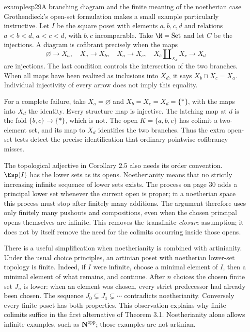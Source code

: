 \begin{dcomment}{examples}{p29}{A branching diagram and the finite meaning of the noetherian case}
Grothendieck's open-set formulation makes a small example particularly instructive. Let $I$ be the square poset with elements $a,b,c,d$ and relations $a<b<d$, $a<c<d$, with $b,c$ incomparable. Take $\M=\mathrm{Set}$ and let $C$ be the injections. A diagram is cofibrant precisely when the maps
\[
 \varnothing\longrightarrow X_a,\quad
 X_a\longrightarrow X_b,\quad X_a\longrightarrow X_c,\quad
 X_b\amalg_{X_a}X_c\longrightarrow X_d
\]
are injections. The last condition controls the intersection of the two branches. When all maps have been realized as inclusions into $X_d$, it says $X_b\cap X_c=X_a$. Individual injectivity of every arrow does not imply this equality.

For a complete failure, take $X_a=\varnothing$ and $X_b=X_c=X_d=\{*\}$, with the maps into $X_d$ the identity. Every structure map is injective. The latching map at $d$ is the fold $\{b,c\}\to\{*\}$, which is not. The open $K=\{a,b,c\}$ has colimit a two-element set, and its map to $X_d$ identifies the two branches. Thus the extra open-set tests detect the precise identification that ordinary pointwise cofibrancy misses.

The topological adjective in Corollary 2.5 also needs its order convention. $\Esp(I)$ has the lower sets as its opens. Noetherianity means that no strictly increasing infinite sequence of lower sets exists. The process on page 30 adds a principal lower set whenever the current open is proper; in a noetherian space this process must stop after finitely many additions. The argument therefore uses only finitely many pushouts and compositions, even when the chosen principal opens themselves are infinite. This removes the transfinite \emph{closure} assumption; it does not by itself remove the need for the colimits occurring inside those opens.

There is a useful simplification when noetherianity is combined with artinianity. Under the usual choice principles, an artinian poset with noetherian lower-set topology is finite. Indeed, if $I$ were infinite, choose a minimal element of $I$, then a minimal element of what remains, and continue. After $n$ choices the chosen finite set $J_n$ is lower: when an element was chosen, every strict predecessor had already been chosen. The sequence $J_0\subsetneq J_1\subsetneq\cdots$ contradicts noetherianity. Conversely every finite poset has both properties. This observation explains why finite colimits suffice in the first alternative of Theorem 3.1. Noetherianity alone allows infinite examples, such as $\mathbf N^{\mathrm{opp}}$; those examples are not artinian.
\end{dcomment}

